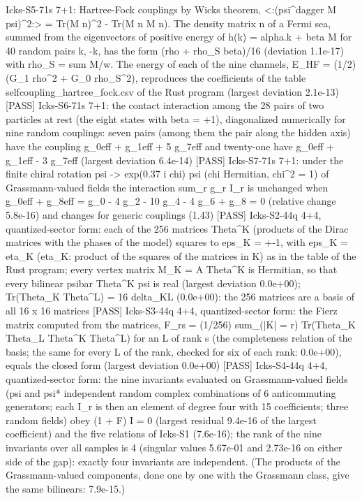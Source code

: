 \documentclass[
  10pt,
]{article}
\newenvironment{Shaded}{}{}
\newcommand{\NormalTok}[1]{#1}
\begin{document}
\begin{Shaded}
\begin{Highlighting}[]
\NormalTok{[PASS] Icks{-}S5{-}71s  7+1: Hartree{-}Fock couplings by Wick\textquotesingle{}s theorem, \textless{}:(psi\^{}dagger M psi)\^{}2:\textgreater{} = Tr(M n)\^{}2 {-} Tr(M n M n). The density matrix n of a Fermi sea, summed from the eigenvectors of positive energy of h(k) = alpha.k + beta M for 40 random pairs k, {-}k, has the form (rho + rho\_S beta)/16 (deviation 1.1e{-}17) with rho\_S = sum M/w. The energy of each of the nine channels, E\_HF = (1/2)(G\_1 rho\^{}2 + G\_0 rho\_S\^{}2), reproduces the coefficients of the table selfcoupling\_hartree\_fock.csv of the Rust program (largest deviation 2.1e{-}13)}
\NormalTok{[PASS] Icks{-}S6{-}71s  7+1: the contact interaction among the 28 pairs of two particles at rest (the eight states with beta = +1), diagonalized numerically for nine random couplings: seven pairs (among them the pair along the hidden axis) have the coupling g\_0eff + g\_1eff + 5 g\_7eff and twenty{-}one have g\_0eff + g\_1eff {-} 3 g\_7eff (largest deviation 6.4e{-}14)}
\NormalTok{[PASS] Icks{-}S7{-}71s  7+1: under the finite chiral rotation psi {-}\textgreater{} exp(0.37 i chi) psi (chi Hermitian, chi\^{}2 = 1) of Grassmann{-}valued fields the interaction sum\_r g\_r I\_r is unchanged when g\_0eff + g\_8eff = g\_0 {-} 4 g\_2 {-} 10 g\_4 {-} 4 g\_6 + g\_8 = 0 (relative change 5.8e{-}16) and changes for generic couplings (1.43)}
\NormalTok{[PASS] Icks{-}S2{-}44q  4+4, quantized{-}sector form: each of the 256 matrices Theta\^{}K (products of the Dirac matrices with the phases of the model) squares to eps\_K = +{-}1, with eps\_K = eta\_K (eta\_K: product of the squares of the matrices in K) as in the table of the Rust program; every vertex matrix M\_K = A Theta\^{}K is Hermitian, so that every bilinear psibar Theta\^{}K psi is real (largest deviation 0.0e+00); Tr(Theta\_K Theta\^{}L) = 16 delta\_KL (0.0e+00): the 256 matrices are a basis of all 16 x 16 matrices}
\NormalTok{[PASS] Icks{-}S3{-}44q  4+4, quantized{-}sector form: the Fierz matrix computed from the matrices, F\_rs = (1/256) sum\_(|K| = r) Tr(Theta\_K Theta\_L Theta\^{}K Theta\^{}L) for an L of rank s (the completeness relation of the basis; the same for every L of the rank, checked for six of each rank: 0.0e+00), equals the closed form (largest deviation 0.0e+00)}
\NormalTok{[PASS] Icks{-}S4{-}44q  4+4, quantized{-}sector form: the nine invariants evaluated on Grassmann{-}valued fields (psi and psi* independent random complex combinations of 6 anticommuting generators; each I\_r is then an element of degree four with 15 coefficients; three random fields) obey (1 + F) I = 0 (largest residual 9.4e{-}16 of the largest coefficient) and the five relations of Icks{-}S1 (7.6e{-}16); the rank of the nine invariants over all samples is 4 (singular values 5.67e{-}01 and 2.73e{-}16 on either side of the gap): exactly four invariants are independent. (The products of the Grassmann{-}valued components, done one by one with the Grassmann class, give the same bilinears: 7.9e{-}15.)}

\end{Highlighting}
\end{Shaded}
\end{document}
